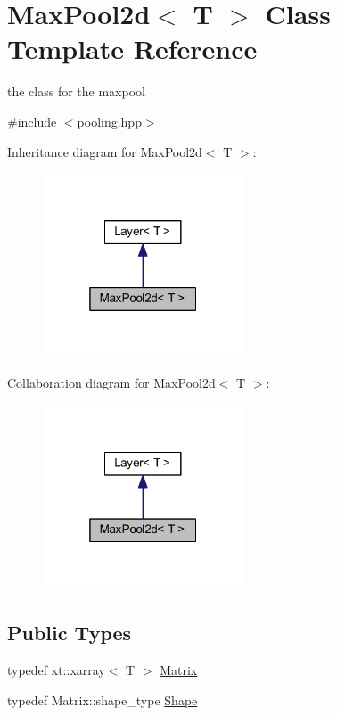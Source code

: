 \hypertarget{class_max_pool2d}{}\section{Max\+Pool2d$<$ T $>$ Class Template Reference}
\label{class_max_pool2d}


the class for the maxpool  




{\ttfamily \#include $<$pooling.\+hpp$>$}



Inheritance diagram for Max\+Pool2d$<$ T $>$\+:
\nopagebreak
\begin{figure}[H]
\begin{center}
\leavevmode
\includegraphics[width=169pt]{class_max_pool2d__inherit__graph}
\end{center}
\end{figure}


Collaboration diagram for Max\+Pool2d$<$ T $>$\+:
\nopagebreak
\begin{figure}[H]
\begin{center}
\leavevmode
\includegraphics[width=169pt]{class_max_pool2d__coll__graph}
\end{center}
\end{figure}
\subsection*{Public Types}
\begin{DoxyCompactItemize}
\item 
typedef xt\+::xarray$<$ T $>$ \mbox{\hyperlink{class_max_pool2d_a8e701daf0dfb0e61e36eec865297a4e9}{Matrix}}
\item 
typedef Matrix\+::shape\+\_\+type \mbox{\hyperlink{class_max_pool2d_ad70f776b32f3a19af78573b634d00072}{Shape}}
\end{DoxyCompactItemize}
